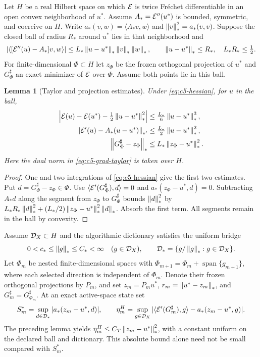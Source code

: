 \documentclass[11pt]{article}
\newtheorem{lemma}[theorem]{Lemma}
\theoremstyle{remark}
\begin{document}
Let $H$ be a real Hilbert space on which $\mathcal E$ is twice Fr\'echet
differentiable in an open convex neighborhood of $u^*$.
Assume $A_*=\mathcal E''(u^*)$ is bounded, symmetric, and coercive on $H$.
Write $a_*(v,w)=\langle A_*v,w\rangle$ and $\left\lVert v\right\rVert_*^2=a_*(v,v)$.
Suppose the closed ball of radius $R_*$ around $u^*$ lies in that
neighborhood and
\begin{equation}
 |\langle[\mathcal E''(u)-A_*]v,w\rangle|
 \leq L_*\left\lVert u-u^*\right\rVert_*\left\lVert v\right\rVert_*\left\lVert w\right\rVert_*,
 \qquad \left\lVert u-u^*\right\rVert_*\leq R_*,\quad L_*R_*\leq\tfrac12 .
 \label{eq:c5-hessian}
\end{equation}
For finite-dimensional $\Phi\subset H$ let $z_\Phi$ be the frozen
orthogonal projection of $u^*$ and $G_\Phi^\sharp$ an exact minimizer
of $\mathcal E$ over $\Phi$. Assume both points lie in this ball.

\begin{lemma}[Taylor and projection estimates]
\label{lem:c5-projection}
Under \eqref{eq:c5-hessian}, for $u$ in the ball,
\begin{align}
 \left|\mathcal E(u)-\mathcal E(u^*)-\tfrac12\left\lVert u-u^*\right\rVert_*^2\right|
 &\leq\tfrac{L_*}{6}\left\lVert u-u^*\right\rVert_*^3,\label{eq:c5-taylor}\\
 \left\lVert\mathcal E'(u)-A_*(u-u^*)\right\rVert_{*'}
 &\leq\tfrac{L_*}{2}\left\lVert u-u^*\right\rVert_*^2,\label{eq:c5-grad-taylor}\\
 \left\lVert G_\Phi^\sharp-z_\Phi\right\rVert_*
 &\leq L_*\left\lVert z_\Phi-u^*\right\rVert_*^2.\label{eq:c5-proj}
\end{align}
Here the dual norm in \eqref{eq:c5-grad-taylor} is taken over $H$.
\end{lemma}
\begin{proof}
One and two integrations of \eqref{eq:c5-hessian} give the first
two estimates. Put $d=G_\Phi^\sharp-z_\Phi\in\Phi$.
Use $\langle\mathcal E'(G_\Phi^\sharp),d\rangle=0$ and
$a_*(z_\Phi-u^*,d)=0$. Subtracting $A_*d$ along the segment from
$z_\Phi$ to $G_\Phi^\sharp$ bounds
$\left\lVert d\right\rVert_*^2$ by
$L_*R_*\left\lVert d\right\rVert_*^2+(L_*/2)\left\lVert z_\Phi-u^*\right\rVert_*^2\left\lVert d\right\rVert_*$.
Absorb the first term. All segments remain in the ball by convexity.
\end{proof}

Assume $\mathcal D_X\subset H$ and the algorithmic dictionary satisfies the uniform bridge
\begin{equation}
 0<c_*\leq\left\lVert g\right\rVert_*\leq C_*<\infty\quad(g\in\mathcal D_X),\qquad
 \mathcal D_*=\{g/\left\lVert g\right\rVert_*:g\in\mathcal D_X\}.
 \label{eq:c5-bridge}
\end{equation}
Let $\Phi_m$ be nested finite-dimensional spaces with
$\Phi_{m+1}=\Phi_m+\operatorname{span}\{g_{m+1}\}$, where each selected
direction is independent of $\Phi_m$. Denote their frozen orthogonal
projections by $P_m$, and set $z_m=P_mu^*$,
$r_m=\left\lVert u^*-z_m\right\rVert_*$, and
$G_m^\sharp=G_{\Phi_m}^\sharp$.
At an exact active-space state set
\[
 S_m^*=\sup_{d\in\mathcal D_*}|a_*(z_m-u^*,d)|,\qquad
 \eta_m^H=\sup_{g\in\mathcal D_X}
 |\langle\mathcal E'(G_m^\sharp),g\rangle-a_*(z_m-u^*,g)|.
\]
The preceding lemma yields
$\eta_m^H\leq C_T\left\lVert z_m-u^*\right\rVert_*^2$, with a constant uniform on the
declared ball and dictionary. This absolute bound alone need not be
small compared with $S_m^*$.
\end{document}

